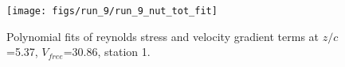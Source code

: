\begin{figure}[H]
\centering
\texttt{[image: figs/run\_9/run\_9\_nut\_tot\_fit]}
\caption{Polynomial fits of reynolds stress and velocity gradient terms at $z/c$=5.37, $V_{free}$=30.86, station 1.}
\label{fig:run_9_nut_tot_fit}
\end{figure}


